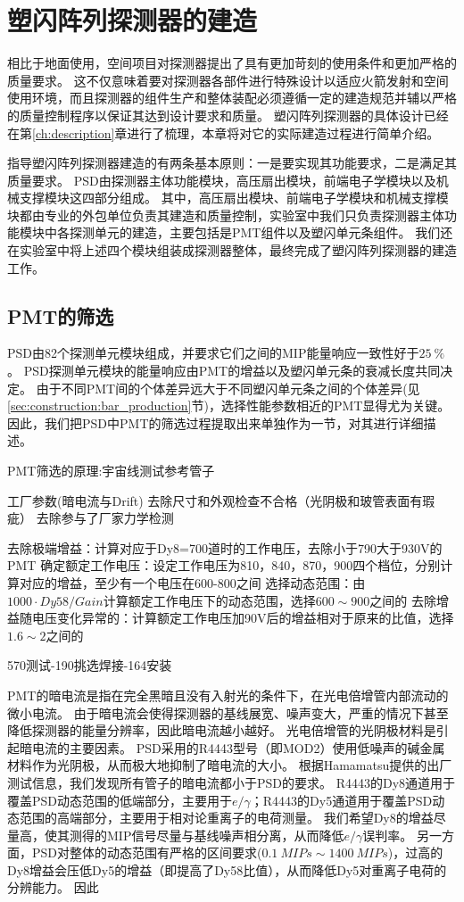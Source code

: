 \chapter{塑闪阵列探测器的建造}
\label{ch:construction}
相比于地面使用，空间项目对探测器提出了具有更加苛刻的使用条件和更加严格的质量要求。
这不仅意味着要对探测器各部件进行特殊设计以适应火箭发射和空间使用环境，而且探测器的组件生产和整体装配必须遵循一定的建造规范并辅以严格的质量控制程序以保证其达到设计要求和质量。
塑闪阵列探测器的具体设计已经在第\ref{ch:description}章进行了梳理，本章将对它的实际建造过程进行简单介绍。

指导塑闪阵列探测器建造的有两条基本原则：一是要实现其功能要求，二是满足其质量要求。
PSD由探测器主体功能模块，高压扇出模块，前端电子学模块以及机械支撑模块这四部分组成。
其中，高压扇出模块、前端电子学模块和机械支撑模块都由专业的外包单位负责其建造和质量控制，实验室中我们只负责探测器主体功能模块中各探测单元的建造，主要包括是PMT组件以及塑闪单元条组件。
我们还在实验室中将上述四个模块组装成探测器整体，最终完成了塑闪阵列探测器的建造工作。

\section{PMT的筛选}
\label{sec:construction:pmt_selection}
PSD由82个探测单元模块组成，并要求它们之间的MIP能量响应一致性好于$\SI{25}{\percent}$。
PSD探测单元模块的能量响应由PMT的增益以及塑闪单元条的衰减长度共同决定。
由于不同PMT间的个体差异远大于不同塑闪单元条之间的个体差异(见\ref{sec:construction:bar_production}节)，选择性能参数相近的PMT显得尤为关键。
因此，我们把PSD中PMT的筛选过程提取出来单独作为一节，对其进行详细描述。

PMT筛选的原理:宇宙线测试参考管子

工厂参数(暗电流与Drift)
去除尺寸和外观检查不合格（光阴极和玻管表面有瑕疵）
去除参与了厂家力学检测

去除极端增益：计算对应于Dy8=700道时的工作电压，去除小于790大于930V的PMT
确定额定工作电压：设定工作电压为810，840，870，900四个档位，分别计算对应的增益，至少有一个电压在600-800之间
选择动态范围：由$1000\cdot Dy58 / Gain$计算额定工作电压下的动态范围，选择$600\sim900$之间的
去除增益随电压变化异常的：计算额定工作电压加90V后的增益相对于原来的比值，选择$1.6\sim 2$之间的

570测试-190挑选焊接-164安装

PMT的暗电流是指在完全黑暗且没有入射光的条件下，在光电倍增管内部流动的微小电流。
由于暗电流会使得探测器的基线展宽、噪声变大，严重的情况下甚至降低探测器的能量分辨率，因此暗电流越小越好。
光电倍增管的光阴极材料是引起暗电流的主要因素。
PSD采用的R4443型号（即MOD2）使用低噪声的碱金属材料作为光阴极，从而极大地抑制了暗电流的大小。
根据Hamamatsu提供的出厂测试信息，我们发现所有管子的暗电流都小于PSD的要求。
R4443的Dy8通道用于覆盖PSD动态范围的低端部分，主要用于$e/\gamma$；R4443的Dy5通道用于覆盖PSD动态范围的高端部分，主要用于相对论重离子的电荷测量。
我们希望Dy8的增益尽量高，使其测得的MIP信号尽量与基线噪声相分离，从而降低$e/\gamma$误判率。
另一方面，PSD对整体的动态范围有严格的区间要求($\SI{0.1}{MIPs}\sim\SI{1400}{MIPs}$)，过高的Dy8增益会压低Dy5的增益（即提高了Dy58比值），从而降低Dy5对重离子电荷的分辨能力。
因此

